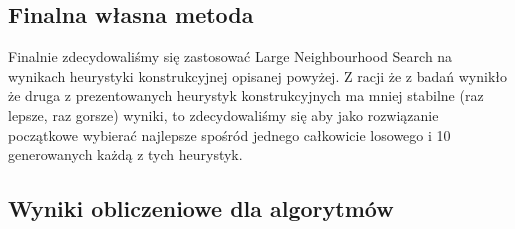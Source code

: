 \documentclass[11pt]{article}
\begin{document}
\subsection{Finalna własna metoda}\label{subsec:finalna-wasna-metoda}

Finalnie zdecydowaliśmy się zastosować Large Neighbourhood Search na wynikach heurystyki konstrukcyjnej opisanej powyżej.
Z racji że z badań wynikło że druga z prezentowanych heurystyk konstrukcyjnych ma mniej stabilne (raz lepsze, raz gorsze) wyniki,
to zdecydowaliśmy się aby jako rozwiązanie początkowe wybierać najlepsze spośród jednego całkowicie losowego i 10 generowanych każdą z tych heurystyk.



\subsection{Wyniki obliczeniowe dla algorytmów}\label{subsec:wyniki-obliczeniowe-dla-algorytmow}

\begin{table}[ht]
\centering
{}
\caption{Wyniki dla \texttt{kroA200}}\label{tab:table}
\end{table}
\end{document}
